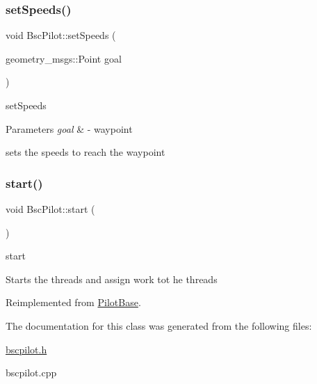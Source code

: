 \mbox{\label{classBscPilot_a9f8ae1db08a3e84fed7c44d3bad3504b}} 
\subsubsection{\texorpdfstring{set\+Speeds()}{setSpeeds()}}
{\footnotesize\ttfamily void Bsc\+Pilot\+::set\+Speeds (\begin{DoxyParamCaption}\item[{geometry\+\_\+msgs\+::\+Point}]{goal }\end{DoxyParamCaption})\hspace{0.3cm}{\ttfamily [protected]}}



set\+Speeds 


\begin{DoxyParams}{Parameters}
{\em goal} & -\/ waypoint\\
\hline
\end{DoxyParams}
sets the speeds to reach the waypoint \mbox{\label{classBscPilot_a121a0ff2e9fc49b68d344d6785703702}} 
\subsubsection{\texorpdfstring{start()}{start()}}
{\footnotesize\ttfamily void Bsc\+Pilot\+::start (\begin{DoxyParamCaption}{ }\end{DoxyParamCaption})\hspace{0.3cm}{\ttfamily [virtual]}}



start 

Starts the threads and assign work tot he threads 

Reimplemented from \hyperlink{classPilotBase_a3480ea2023ca1459b32b79abf8a3400d}{Pilot\+Base}.



The documentation for this class was generated from the following files\+:\begin{DoxyCompactItemize}
\item 
\hyperlink{bscpilot_8h}{bscpilot.\+h}\item 
bscpilot.\+cpp\end{DoxyCompactItemize}

